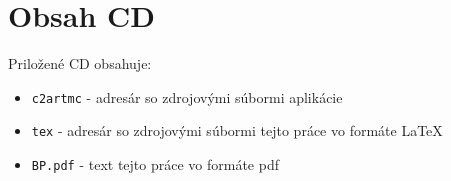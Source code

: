 





\chapter{Obsah CD}
Priložené CD obsahuje:
\begin{itemize}
\item \texttt{c2artmc} - adresár so zdrojovými súbormi aplikácie
\item \texttt{tex} - adresár so zdrojovými súbormi tejto práce vo formáte \LaTeX
\item \texttt{BP.pdf} - text tejto práce vo formáte pdf  
\end{itemize}
